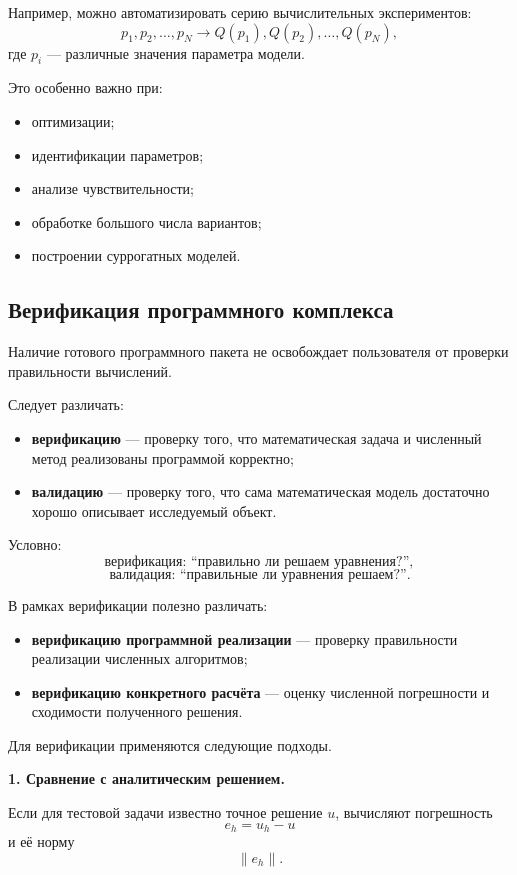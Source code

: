 Например, можно автоматизировать серию вычислительных экспериментов:
\[
p_1,p_2,\ldots,p_N
\longrightarrow
Q(p_1),Q(p_2),\ldots,Q(p_N),
\]
где $p_i$ --- различные значения параметра модели.

Это особенно важно при:
\begin{itemize}
	\item оптимизации;
	\item идентификации параметров;
	\item анализе чувствительности;
	\item обработке большого числа вариантов;
	\item построении суррогатных моделей.
\end{itemize}

\subsection{Верификация программного комплекса}

Наличие готового программного пакета не освобождает пользователя от проверки правильности вычислений.

Следует различать:
\begin{itemize}
	\item \textbf{верификацию} --- проверку того, что математическая задача и численный метод реализованы программой корректно;
	\item \textbf{валидацию} --- проверку того, что сама математическая модель достаточно хорошо описывает исследуемый объект.
\end{itemize}

Условно:
\[
\text{верификация: ``правильно ли решаем уравнения?''},
\]
\[
\text{валидация: ``правильные ли уравнения решаем?''}.
\]

В рамках верификации полезно различать:
\begin{itemize}
	\item \textbf{верификацию программной реализации} --- проверку правильности реализации численных алгоритмов;
	\item \textbf{верификацию конкретного расчёта} --- оценку численной погрешности и сходимости полученного решения.
\end{itemize}

Для верификации применяются следующие подходы.

\textbf{1. Сравнение с аналитическим решением.}

Если для тестовой задачи известно точное решение $u$, вычисляют погрешность
\[
e_h=u_h-u
\]
и её норму
\[
\|e_h\|.
\]

